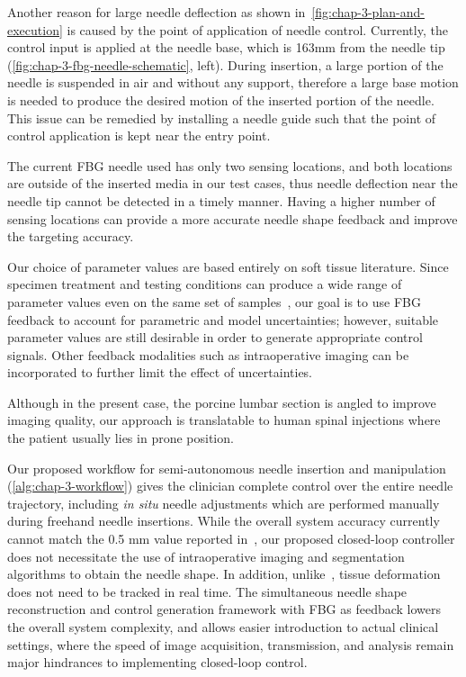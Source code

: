 Another reason for large needle deflection as shown in~\cref{fig:chap-3-plan-and-execution} is caused by the point of application of needle control. Currently, the control input is applied at the needle base, which is 163mm from the needle tip (\cref{fig:chap-3-fbg-needle-schematic}, left). During insertion, a large portion of the needle is suspended in air and without any support, therefore a large base motion is needed to produce the desired motion of the inserted portion of the needle. This issue can be remedied by installing a needle guide such that the point of control application is kept near the entry point.

The current FBG needle used has only two sensing locations, and both locations are outside of the inserted media in our test cases, thus needle deflection near the needle tip cannot be detected in a timely manner. Having a higher number of sensing locations can provide a more accurate needle shape feedback and improve the targeting accuracy.

Our choice of parameter values are based entirely on soft tissue literature. Since specimen treatment and testing conditions can produce a wide range of parameter values even on the same set of samples~\parencite{bosboomPassiveTransverseMechanical2001,calvoPassiveNonlinearElastic2010,binder-markeySystematicReviewSkeletal2021}, our goal is to use FBG feedback to account for parametric and model uncertainties; however, suitable parameter values are still desirable in order to generate appropriate control signals. Other feedback modalities such as intraoperative imaging can be incorporated to further limit the effect of uncertainties.

Although in the present case, the porcine lumbar section is angled to improve imaging quality, our approach is translatable to human spinal injections where the patient usually lies in prone position.

Our proposed workflow for semi-autonomous needle insertion and manipulation (\cref{alg:chap-3-workflow}) gives the clinician complete control over the entire needle trajectory, including \textit{in situ} needle adjustments which are performed manually during freehand needle insertions. While the overall system accuracy currently cannot match the 0.5 mm value reported in~\parencite{glozmanImageGuidedRoboticFlexible2007}, our proposed closed-loop controller does not necessitate the use of intraoperative imaging and segmentation algorithms to obtain the needle shape. In addition, unlike~\parencite{adagolodjoRoboticInsertionFlexible2019}, tissue deformation does not need to be tracked in real time. The simultaneous needle shape reconstruction and control generation framework with FBG as feedback lowers the overall system complexity, and allows easier introduction to actual clinical settings, where the speed of image acquisition, transmission, and analysis remain major hindrances to implementing closed-loop control.

